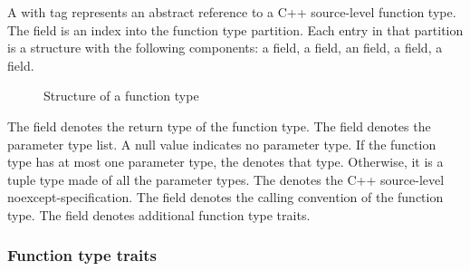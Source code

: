 A  with tag  represents
an abstract reference to a C++ source-level function type.
The  field is an index into the function type partition.
Each entry in that partition is a structure with the following components:
a  field, a  field, an  field,
a  field, a  field.
%
\begin{figure}[H]
	\centering
	\caption{Structure of a function type}
	\label{fig:ifc-function-type-structure}
\end{figure}
%
The  field denotes the return type of the function type.
The  field denotes the parameter type list.  A null  value indicates no parameter type. If the function type has at most
one parameter type, the  denotes that type. Otherwise, it is a tuple type made
of all the parameter types.
The  denotes the C++ source-level noexcept-specification.
The  field denotes the calling convention of the function type.
The  field denotes additional function type traits.


\subsubsection{Function type traits}
\label{sec:ifc-function-type-traits}

